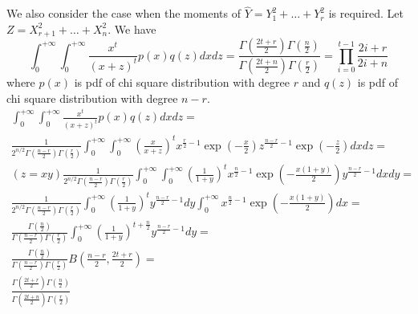 \documentclass{article}
\begin{document}
We also consider the case when the moments of
$\hat{Y} = Y_1^2 + \dots + Y_r^2$ is required.
Let $Z = X_{r+1}^2 + \dots + X_n^2$. We have
\begin{equation}\label{eq:n4}
\int_{0}^{+\infty}\int_{0}^{+\infty} \frac{x^t}{(x+z)^t} p(x)q(z) dxdz =
\frac{\Gamma(\frac{2t+r}{2})\Gamma(\frac{n}{2})}
{\Gamma(\frac{2t+n}{2})\Gamma(\frac{r}{2})} =
\prod_{i=0}^{t-1} \frac{2i+r}{2i+n}
\end{equation}
where $p(x)$ is pdf of chi square distribution with degree $r$ and $q(z)$
is pdf of chi square distribution with degree $n-r$.
\begin{align*}
\int_{0}^{+\infty}\int_{0}^{+\infty} \frac{x^t}{(x+z)^t} p(x)q(z) dxdz =
& \\ \frac{1}{2^{n/2} \Gamma(\frac{n-r}{2})\Gamma(\frac{r}{2})}
\int_{0}^{+\infty}\int_{0}^{+\infty}
\left(\frac{x}{x+z}\right)^t
x^{\frac{r}{2}-1}\exp(-\frac{x}{2})
z^{\frac{n-r}{2}-1}\exp(-\frac{z}{2})dxdz =
& \\ (z=xy) \frac{1}{2^{n/2}\Gamma(\frac{n-r}{2})\Gamma(\frac{r}{2})}
\int_{0}^{+\infty}\int_{0}^{+\infty}
\left(\frac{1}{1+y}\right)^t
x^{\frac{n}{2}-1}\exp(-\frac{x(1+y)}{2})y^{\frac{n-r}{2}-1}dxdy =
& \\  \frac{1}{2^{n/2} \Gamma(\frac{n-r}{2})\Gamma(\frac{r}{2})}
\int_{0}^{+\infty}\left(\frac{1}{1+y}\right)^t
y^{\frac{n-r}{2}-1} dy
\int_{0}^{+\infty} x^{\frac{n}{2}-1}\exp(-\frac{x(1+y)}{2})dx = & \\
\frac{\Gamma(\frac{n}{2})}{\Gamma(\frac{n-r}{2})\Gamma(\frac{r}{2})}
\int_{0}^{+\infty}\left(\frac{1}{1+y}\right)^{t+\frac{n}{2}}
y^{\frac{n-r}{2}-1} dy =
& \\  \frac{\Gamma(\frac{n}{2})}{\Gamma(\frac{n-r}{2})\Gamma(\frac{r}{2})}
B(\frac{n-r}{2}, \frac{2t+r}{2}) =
& \\ \frac{\Gamma(\frac{2t+r}{2})\Gamma(\frac{n}{2})}
{\Gamma(\frac{2t+n}{2})\Gamma(\frac{r}{2})}
\end{align*}
\end{document}
